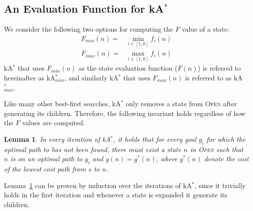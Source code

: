 \documentclass{aicom2e}
\newtheorem{lemma}{Lemma}
\newcommand{\astar}{A$^*$}
\newcommand{\kastar}{kA$^*$}
\newcommand{\kastarmin}{kA$^*_{min}$}
\newcommand{\kastarmax}{kA$^*_{max}$}
\newcommand{\minf}{$F_{min}(n)$}
\newcommand{\maxf}{$F_{max}(n)$}
\newcommand{\open}{\textsc{Open}}
\begin{document}
\subsection{An Evaluation Function for \kastar{}}

We consider the following two options for computing the $F$ value of a state:
\begin{align}
\text{\minf{}}=&\min_{i\in [1,k]}f_i(n) \\
\text{\maxf{}}=&\max_{i\in [1,k]}f_i(n)
\end{align}
\kastar{} that uses \minf{} as the state evaluation function ($F(n)$) is referred to hereinafter as \kastarmin{}, and similarly \kastar{}
that uses \maxf{} is referred to as \kastarmax{}.



Like many other best-first searches, \kastar{} only removes a state from \open{} after generating its children. Therefore, the following invariant holds regardless of how the $F$ values are computed.
\begin{lemma}
    In every iteration of \kastar{}, it holds that
    for every goal $g_i$ for which the optimal path to has not been found,
    there must exist a state $n$ in \open{} such that $n$ is on an optimal path
    to $g_i$ and $g(n)=g^*(n)$, where $g^*(n)$ denote the cost of the lowest cost path from $s$ to $n$.
    \label{lem:simple}
\end{lemma}
Lemma~\ref{lem:simple} can be proven by induction over the iterations of \kastar{},
since it trivially holds in the first iteration and whenever a state is expanded it generate its children.
\end{document}
